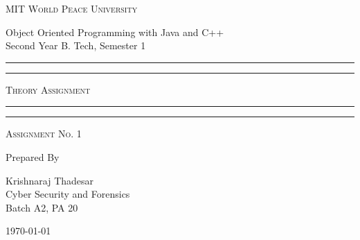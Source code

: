 \documentclass[11pt]{article}
\begin{document}
\begin{titlepage}
	\centering


	\huge\textsc{
		MIT World Peace University
	}\\

	\vspace{0.75\baselineskip} %

	\LARGE{
		Object Oriented Programming with Java and C++\\
		Second Year B. Tech, Semester 1
	}

	\vfill %


	\rule{\textwidth}{1.6pt}\vspace*{-\baselineskip}\vspace*{2pt}
	\rule{\textwidth}{0.6pt}
	\vspace{0.75\baselineskip} %



	\huge{\textsc{
			Theory Assignment
		}} \\



	\vspace{0.5\baselineskip} %
	\rule{\textwidth}{0.6pt}\vspace*{-\baselineskip}\vspace*{2.8pt}
	\rule{\textwidth}{1.6pt}

	\vspace{1\baselineskip} %


	\LARGE\textsc{
		Assignment No. 1
	} %
	\vfill


	Prepared By
	\vspace{0.5\baselineskip} %

	\Large{
		Krishnaraj Thadesar \\
		Cyber Security and Forensics\\
		Batch A2, PA 20
	}


	\vspace{0.5\baselineskip} %
	\today

\end{titlepage}
\end{document}
